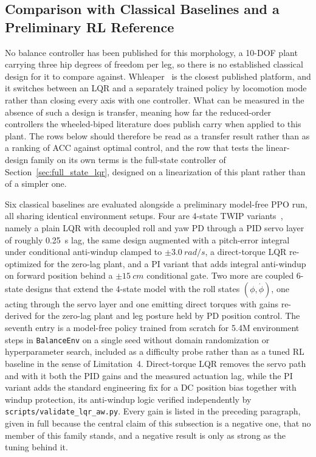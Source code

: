 \documentclass[a4paper,fleqn]{cas-dc}
\begin{document}
\subsection{Comparison with Classical Baselines and a Preliminary RL Reference}
\label{sec:baselines}

No balance controller has been published for this morphology, a \num{10}-DOF
plant carrying three hip degrees of freedom per leg, so there is no established
classical design for it to compare against. Whleaper~\cite{whleaper2024} is the
closest published platform, and it switches between an LQR and a separately
trained policy by locomotion mode rather than closing every axis with one
controller. What can be measured in the absence of such a design is transfer,
meaning how far the reduced-order controllers the wheeled-biped literature does
publish carry when applied to this plant. The rows below should therefore be read
as a transfer result rather than as a ranking of ACC against optimal control, and
the row that tests the linear-design family on its own terms is the full-state
controller of Section~\ref{sec:full_state_lqr}, designed on a linearization of
this plant rather than of a simpler one.

Six classical baselines are evaluated alongside a preliminary model-free PPO run,
all sharing identical environment setups. Four are 4-state TWIP
variants~\cite{grasser2002joe,pathak2005wip}, namely a plain LQR with decoupled
roll and yaw PD through a PID servo layer of roughly \SI{0.25}{s} lag, the same
design augmented with a pitch-error integral under conditional anti-windup
clamped to $\pm\SI{3.0}{rad/s}$, a direct-torque LQR re-optimized for the
zero-lag plant, and a PI variant that adds integral anti-windup on forward
position behind a $\pm\SI{15}{cm}$ conditional gate. Two more are coupled 6-state
designs that extend the 4-state model with the roll states $(\phi,\dot\phi)$, one
acting through the servo layer and one emitting direct torques with gains
re-derived for the zero-lag plant and leg posture held by PD position control.
The seventh entry is a model-free policy trained from scratch for \num{5.4}M
environment steps in \texttt{BalanceEnv} on a single seed without domain
randomization or hyperparameter search, included as a difficulty probe rather
than as a tuned RL baseline in the sense of Limitation~4. Direct-torque LQR
removes the servo path and with it both the PID gains and the measured actuation
lag, while the PI variant adds the standard engineering fix for a DC position
bias together with windup protection, its anti-windup logic verified
independently by \texttt{scripts/validate\_lqr\_aw.py}. Every gain is listed in
the preceding paragraph, given in full because the central claim of this
subsection is a negative one, that no member of this family stands, and a
negative result is only as strong as the tuning behind it.
\end{document}
